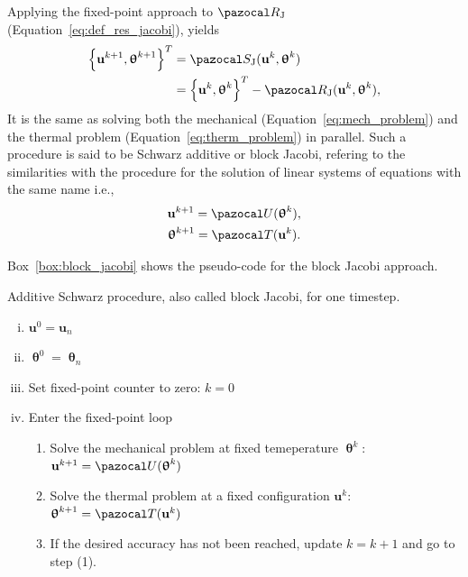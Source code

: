 Applying the fixed-point approach to \(\pazocal R_\mathrm{J}\) (Equation~\eqref{eq:def_res_jacobi}), yields
\begin{align}
  \left\{\mathbf u^{k+1}, \bm\uptheta^{k+1}\right\}^T &= \pazocal S_\mathrm{J}(\mathbf u^k, \bm\uptheta^k)\\
   &= \left\{\mathbf u^k, \bm\uptheta^k\right\}^T - \pazocal R_\mathrm{J}(\mathbf u^k, \bm \uptheta^k),
\end{align}
It is the same as solving both the mechanical (Equation~\eqref{eq:mech_problem}) and the thermal problem (Equation~\eqref{eq:therm_problem}) in parallel.
Such a procedure is said to be Schwarz additive or block Jacobi, refering to the similarities with the procedure for the solution of linear systems of equations with the same name i.e.,
\begin{gather}
\mathbf u^{k+1} = \pazocal U(\bm \uptheta^k),\\
\bm \uptheta^{k+1} = \pazocal T(\mathbf u^k).
\end{gather}

Box~\ref{box:block_jacobi} shows the pseudo-code for the block Jacobi approach.

\begin{framedbox}[htb]
  \caption{Additive Schwarz procedure, also called block Jacobi, for one timestep.}
  \label{box:block_jacobi}
  \begin{center}
    \begin{minipage}{0.9\textwidth}
    \begin{enumerate}[(i)]
    \item \(\mathbf u^0 = \mathbf u_{n}\)
    \item \(\bm \uptheta^0 = \bm \uptheta_n\)
    \item Set fixed-point counter to zero: \(k=0\)
    \item Enter the fixed-point loop
    \begin{enumerate}[(1)]
      \item Solve the mechanical problem at fixed temeperature \(\bm \uptheta^k\): \(\mathbf u^{k+1} = \pazocal U(\bm \uptheta^k)\)
      \item Solve the thermal problem at a fixed configuration \(\mathbf u^k\): \(\bm \uptheta^{k+1} = \pazocal T(\mathbf u^k)\)
      \item If the desired accuracy has not been reached, update \(k=k+1\) and go to step (1).

    \end{enumerate}
    \end{enumerate}
    \end{minipage}
  \end{center}
\end{framedbox}

